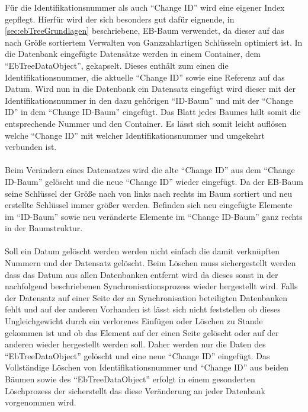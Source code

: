 \documentclass[a4paper,11pt,oneside,%
headsepline,												%
footsepline,												%
bibtotocnumbered									%
]{scrreprt}
\begin{document}
Für die Identifikationsnummer als auch \enquote{Change ID} wird eine eigener Index gepflegt. Hierfür wird der sich besonders gut dafür eignende, in \autoref{sec:ebTreeGrundlagen} beschriebene, \ac{EB-Baum} verwendet, da dieser auf das nach Größe sortiertem Verwalten von Ganzzahlartigen Schlüsseln optimiert ist. In die Datenbank eingefügte Datensätze werden in einem Container, dem \enquote{EbTreeDataObject}, gekapselt. Dieses enthält zum einen die Identifikationsnummer, die aktuelle \enquote{Change ID} sowie eine Referenz auf das Datum. Wird nun in die Datenbank ein Datensatz eingefügt wird dieser mit der Identifikationsnummer in den dazu gehörigen \enquote{ID-Baum} und mit der \enquote{Change ID} in dem \enquote{Change ID-Baum} eingefügt. Das Blatt jedes Baumes hält somit die entsprechende Nummer und den Container. Es lässt sich somit leicht auflösen welche \enquote{Change ID} mit welcher Identifikationsnummer und umgekehrt verbunden ist. \\\\
Beim Verändern eines Datensatzes wird die alte \enquote{Change ID} aus dem \enquote{Change ID-Baum} gelöscht und die neue \enquote{Change ID} wieder eingefügt. Da der \ac{EB-Baum} seine Schlüssel der Größe nach von links nach rechts im Baum sortiert und neu erstellte Schlüssel immer größer werden. Befinden sich neu eingefügte Elemente im \enquote{ID-Baum} sowie neu veränderte Elemente im \enquote{Change ID-Baum} ganz rechts in der Baumstruktur.\\\\
Soll ein Datum gelöscht werden werden nicht einfach die damit verknüpften Nummern und der Datensatz gelöscht. Beim Löschen muss sichergestellt werden dass das Datum aus allen Datenbanken entfernt wird da dieses sonst in der nachfolgend beschriebenen Synchronisationsprozess wieder hergestellt wird. Falls der Datensatz auf einer Seite der an Synchronisation beteiligten Datenbanken fehlt und auf der anderen Vorhanden ist lässt sich nicht feststellen ob dieses Ungleichgewicht durch ein verlorenes Einfügen oder Löschen zu Stande gekommen ist und ob das Element auf der einen Seite gelöscht oder auf der anderen wieder hergestellt werden soll. Daher werden nur die Daten des \enquote{EbTreeDataObject} gelöscht und eine neue \enquote{Change ID} eingefügt. Das Vollständige Löschen von Identifikationsnummer und \enquote{Change ID} aus beiden Bäumen sowie des \enquote{EbTreeDataObject} erfolgt in einem gesonderten Löschprozess der sicherstellt das diese Veränderung an jeder Datenbank vorgenommen wird.
\end{document}
